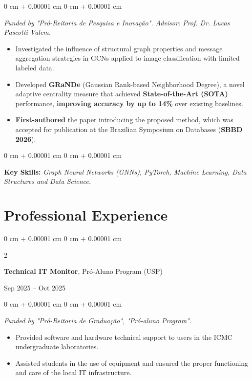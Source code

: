 \documentclass[10pt, letterpaper]{article}
\newenvironment{highlights}{
    \begin{itemize}[
        topsep=0.10 cm,
        parsep=0.10 cm,
        partopsep=0pt,
        itemsep=0pt,
        leftmargin=0 cm + 10pt
    ]
}{
    \end{itemize}
} %
\newenvironment{onecolentry}{
    \begin{adjustwidth}{
        0 cm + 0.00001 cm
    }{
        0 cm + 0.00001 cm
    }
}{
    \end{adjustwidth}
} %
\newenvironment{twocolentry}[2][]{
    \onecolentry
    \def\secondColumn{#2}
    \setcolumnwidth{\fill, 4.5 cm}
    \begin{paracol}{2}
}{
    \switchcolumn \raggedleft \secondColumn
    \end{paracol}
    \endonecolentry
} %
\begin{document}
\vspace{0.10 cm}
\begin{onecolentry}
    \textit{Funded by "Pró-Reitoria de Pesquisa e Inovação". Advisor: Prof. Dr. Lucas Pascotti Valem.}
\begin{highlights}
        \item Investigated the influence of structural graph properties and message aggregation strategies in GCNs applied to image classification with limited labeled data.
        \item Developed \textbf{GRaNDe} (Gaussian Rank-based Neighborhood Degree), a novel adaptive centrality measure that achieved \textbf{State-of-the-Art (SOTA)} performance, \textbf{improving accuracy by up to 14\%} over existing baselines.
        \item \textbf{First-authored} the paper introducing the proposed method, which was accepted for publication at the Brazilian Symposium on Databases (\textbf{SBBD 2026}).
    \end{highlights}
\end{onecolentry}
\vspace{0.10 cm}
\begin{onecolentry}
    \setlength{\leftskip}{0.3cm}
    {\footnotesize \textbf{Key Skills:} \textit{Graph Neural Networks (GNNs), PyTorch, Machine Learning, Data Structures and Data Science.}}
\end{onecolentry}

\vspace{0.15cm}

\section{Professional Experience}

\begin{twocolentry}{
    Sep 2025 – Oct 2025
}
    \textbf{Technical IT Monitor}, Pró-Aluno Program (USP)
\end{twocolentry}

\vspace{0.10 cm}
\begin{onecolentry}
    \textit{Funded by "Pró-Reitoria de Graduação", "Pró-aluno Program".}
    \begin{highlights}
        \item Provided software and hardware technical support to users in the ICMC undergraduate laboratories.
        \item Assisted students in the use of equipment and ensured the proper functioning and care of the local IT infrastructure.
    \end{highlights}
\end{onecolentry}
\end{document}
